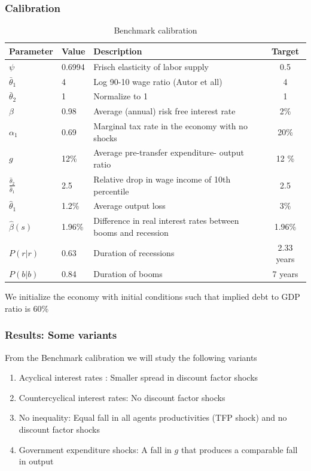\documentclass{beamer}
\begin{document}
\begin{frame}
 \frametitle{Calibration}
 
{\tiny
\begin{table}[htp]
{\tiny
\begin{tabular}{|l|l|l|c|}
\hline
Parameter & Value & Description &Target   \\ \hline
$\psi$ & 0.6994 &Frisch elasticity of labor supply & 0.5   \\
$\bar{\theta}_1 $ & 4& Log 90-10 wage ratio (Autor et all) & 4   \\
$\bar{\theta}_2 $ & 1 &Normalize to 1 & 1  \\
$\beta$ & 0.98  &Average (annual) risk free interest rate & 2\%   \\
$\alpha_1$ & 0.69 & Marginal tax rate in the economy with no shocks & 20\% \\
$g$ & 12\%&Average pre-transfer expenditure- output ratio & 12 \% \\
$\frac{\hat {\theta}_2}{\hat {\theta}_1}$ & 2.5 & Relative drop in wage income of 10th
percentile & 2.5\\
$\hat{\theta}_1$ & 1.2\% & Average output loss& 3\% \\
$\hat{\beta}(s)$ & 1.96\%& Difference in real interest rates between booms and recession& 1.96\% \\
$P(r|r)$ & 0.63&Duration of recessions & 2.33 years \\
$P(b|b)$ & 0.84 &Duration of booms &7 years \\ \hline
\end{tabular}
}
\caption{Benchmark calibration}
\label{tab:Parameters}
\end{table}
}
We initialize the economy with initial conditions such that implied debt to GDP ratio is 60\%
 \end{frame}

\begin{frame}
 \frametitle{Results: Some variants }
 From the Benchmark calibration we will study the following variants
 \begin{enumerate}
\item Acyclical interest rates : Smaller spread in discount factor shocks
\item Countercyclical interest rates: No discount factor shocks 
\item No inequality: Equal fall in all agents productivities (TFP shock) and no discount factor shocks
\item Government expenditure shocks: A fall in $g$ that produces a comparable fall in output 
\end{enumerate}

 \end{frame}
\end{document}
